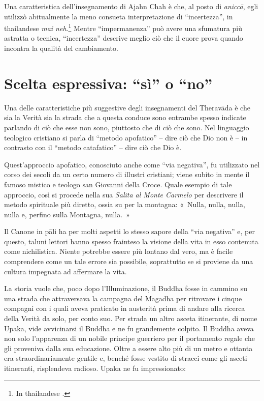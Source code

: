 Una caratteristica dell'insegnamento di Ajahn Chah è che, al posto di
\emph{aniccā}, egli utilizzò abitualmente la meno consueta
interpretazione di ``incertezza'', in thailandese \emph{mai
neh}.\footnote{In thailandese .} Mentre ``impermanenza'' può avere
una sfumatura più astratta o tecnica, ``incertezza'' descrive meglio ciò
che il cuore prova quando incontra la qualità del cambiamento.

\section{Scelta espressiva: ``sì'' o ``no''}

Una delle caratteristiche più suggestive degli insegnamenti del
Theravāda è che sia la Verità sia la strada che a questa conduce sono
entrambe spesso indicate parlando di ciò che esse non sono, piuttosto
che di ciò che sono. Nel linguaggio teologico cristiano si parla di
``metodo apofatico'' -- dire ciò che Dio non è -- in contrasto con il
``metodo catafatico'' -- dire ciò che Dio è.

Quest'approccio apofatico, conosciuto anche come ``via negativa'', fu
utilizzato nel corso dei secoli da un certo numero di illustri
cristiani; viene subito in mente il famoso mistico e teologo san
Giovanni della Croce. Quale esempio di tale approccio, così si procede
nella sua \emph{Salita al Monte Carmelo} per descrivere il metodo
spirituale più diretto, ossia su per la montagna: «~Nulla, nulla, nulla,
nulla e, perfino sulla Montagna, nulla.~»

Il Canone in pāli ha per molti aspetti lo stesso sapore della ``via
negativa'' e, per questo, taluni lettori hanno spesso frainteso la
visione della vita in esso contenuta come nichilistica. Niente potrebbe
essere più lontano dal vero, ma è facile comprendere come un tale errore
sia possibile, soprattutto se si proviene da una cultura impegnata ad
affermare la vita.

La storia vuole che, poco dopo l'Illuminazione, il Buddha fosse in
cammino su una strada che attraversava la campagna del Magadha per
ritrovare i cinque compagni con i quali aveva praticato in austerità
prima di andare alla ricerca della Verità da solo, per conto suo. Per
strada un altro asceta itinerante, di nome Upaka, vide avvicinarsi il
Buddha e ne fu grandemente colpito. Il Buddha aveva non solo
l'apparenza di un nobile principe guerriero per il portamento regale
che gli proveniva dalla sua educazione. Oltre a essere alto più di un
metro e ottanta era straordinariamente gentile e, benché fosse vestito
di stracci come gli asceti itineranti, risplendeva radioso. Upaka ne fu
impressionato:

